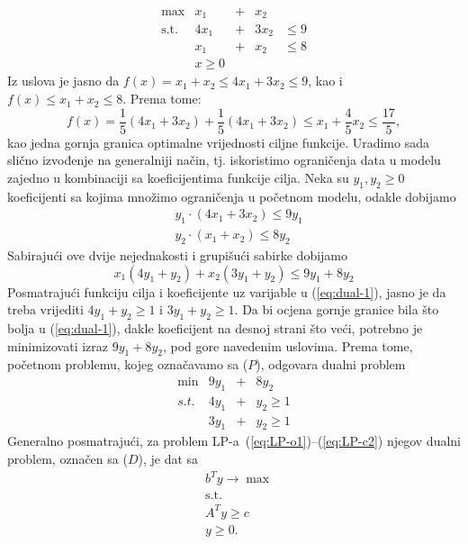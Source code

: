 \documentclass[a4paper, utf8, 11pt, colorlinks]{book}
\begin{document}
$$ 
\begin{array}{lllll}
    \max                  &x_1 &+& x_2   &               \\
    \mbox{s.t.}  &4x_1 & +&3 x_2 & \leq 9        \\
                          &x_1 &+ &x_2   &  \leq 8       \\
                          &x \geq 0  &  &     &      
 \end{array}
$$
Iz uslova je jasno da $f(x) = x_1 + x_2 \leq 4 x_1 + 3 x_2 \leq 9$, kao i 
$f(x) \leq x_1 + x_2 \leq 8$. Prema tome:
$$f(x) = \frac{1}{5}(  4 x_1 + 3 x_2  ) + \frac{1}{5}(  4 x_1 + 3 x_2 ) \leq x_1 + \frac{4}{5}x_2 \leq \frac{17}{5},$$ kao jedna gornja granica optimalne vrijednosti ciljne funkcije. 
Uradimo sada slično izvođenje na generalniji način, tj. iskoristimo ograničenja data u modelu zajedno u kombinaciji sa koeficijentima funkcije cilja. Neka su $y_1, y_2 \geq 0$ koeficijenti sa kojima množimo ograničenja u početnom modelu, odakle dobijamo 
\begin{align*}
    &y_1 \cdot (4x_1 + 3x_2) \leq 9 y_1 \\
    &y_2 \cdot (x_1 + x_2 ) \leq 8 y_2 
\end{align*}
Sabirajući ove dvije nejednakosti i grupišući sabirke dobijamo 
\begin{equation}\label{eq:dual-1}
     x_1 ( 4 y_1 + y_2 ) + x_2 ( 3 y_1 + y_2 ) \leq 9 y_1 + 8 y_2 
\end{equation}
Posmatrajući funkciju cilja i koeficijente uz varijable u (\ref{eq:dual-1}), jasno je da treba vrijediti 
$4 y_1 + y_2 \geq 1$ i $3 y_1 + y_2 \geq 1$. Da bi ocjena gornje granice bila što bolja u (\ref{eq:dual-1}), dakle koeficijent na desnoj strani što veći, potrebno je minimizovati izraz $9y_1 + 8 y_2$, pod gore navedenim uslovima. Prema tome, početnom problemu, kojeg označavamo sa ($P$), odgovara dualni problem 
$$\begin{array}{cccc}
     \min                    &  9 y_1 &+& 8 y_2        \\
     {s.t. }     &  4 y_1 &+& y_2 \geq 1   \\
                             &  3 y_1 &+& y_2 \geq 1
\end{array}$$
Generalno posmatrajući, za problem LP-a~(\ref{eq:LP-o1})--(\ref{eq:LP-c2}) njegov dualni problem, označen sa ($D$), je dat sa 
\begin{align}
     & b^T y \rightarrow \max \\
     & \mbox{s.t.} \nonumber \\
     & A^T y \geq c \\
     & y \geq 0.
\end{align}
\end{document}
